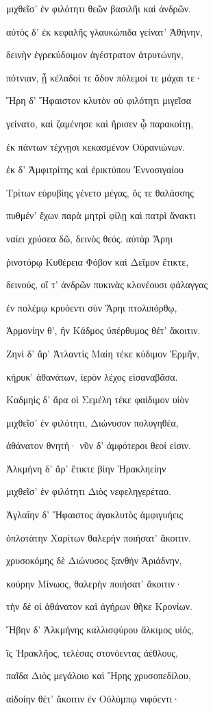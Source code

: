 \begin{pages}
\begin{Leftside}
μιχθεῖσ' ἐν φιλότητι θεῶν βασιλῆι καὶ ἀνδρῶν. 

αὐτὸς δ' ἐκ κεφαλῆς γλαυκώπιδα γείνατ' Ἀθήνην, 

δεινὴν ἐγρεκύδοιμον ἀγέστρατον ἀτρυτώνην,  

πότνιαν, ᾗ κέλαδοί τε ἅδον πόλεμοί τε μάχαι τε· 

Ἥρη δ' Ἥφαιστον κλυτὸν οὐ φιλότητι μιγεῖσα

γείνατο, καὶ ζαμένησε καὶ ἤρισεν ᾧ παρακοίτῃ,

ἐκ πάντων τέχνῃσι κεκασμένον Οὐρανιώνων.

ἐκ δ' Ἀμφιτρίτης καὶ ἐρικτύπου Ἐννοσιγαίου 

Τρίτων εὐρυβίης γένετο μέγας, ὅς τε θαλάσσης 

πυθμέν' ἔχων παρὰ μητρὶ φίλῃ καὶ πατρὶ ἄνακτι

ναίει χρύσεα δῶ, δεινὸς θεός. αὐτὰρ Ἄρηι

ῥινοτόρῳ Κυθέρεια Φόβον καὶ Δεῖμον ἔτικτε, 

δεινούς, οἵ τ' ἀνδρῶν πυκινὰς κλονέουσι φάλαγγας 

ἐν πολέμῳ κρυόεντι σὺν Ἄρηι πτολιπόρθῳ,

Ἁρμονίην θ', ἣν Κάδμος ὑπέρθυμος θέτ' ἄκοιτιν. 

Ζηνὶ δ' ἄρ' Ἀτλαντὶς Μαίη τέκε κύδιμον Ἑρμῆν,

κήρυκ' ἀθανάτων, ἱερὸν λέχος εἰσαναβᾶσα.

Καδμηὶς δ' ἄρα οἱ Σεμέλη τέκε φαίδιμον υἱὸν  

μιχθεῖσ' ἐν φιλότητι, Διώνυσον πολυγηθέα, 

ἀθάνατον θνητή· νῦν δ' ἀμφότεροι θεοί εἰσιν. 

Ἀλκμήνη δ' ἄρ' ἔτικτε βίην Ἡρακληείην

μιχθεῖσ' ἐν φιλότητι Διὸς νεφεληγερέταο. 

Ἀγλαΐην δ' Ἥφαιστος ἀγακλυτὸς ἀμφιγυήεις  

ὁπλοτάτην Χαρίτων θαλερὴν ποιήσατ' ἄκοιτιν.

χρυσοκόμης δὲ Διώνυσος ξανθὴν Ἀριάδνην,

κούρην Μίνωος, θαλερὴν ποιήσατ' ἄκοιτιν· 

τὴν δέ οἱ ἀθάνατον καὶ ἀγήρων θῆκε Κρονίων.

Ἥβην δ' Ἀλκμήνης καλλισφύρου ἄλκιμος υἱός,  

ἲς Ἡρακλῆος, τελέσας στονόεντας ἀέθλους,

παῖδα Διὸς μεγάλοιο καὶ Ἥρης χρυσοπεδίλου,

αἰδοίην θέτ' ἄκοιτιν ἐν Οὐλύμπῳ νιφόεντι· 


\end{Leftside}
\end{pages}
